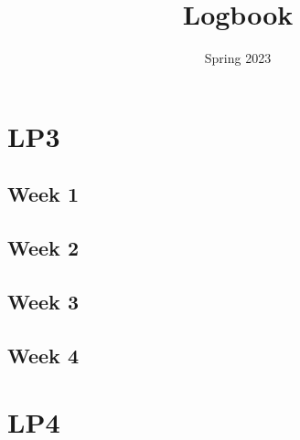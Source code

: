 \documentclass{article}
\title{Logbook}
\date{Spring 2023}
\newcommand{\logentry}[2]{
    \subsection{Week #2}
    
    \newpage
}
\begin{document}
\maketitle
\newpage
\tableofcontents
\newpage


\section{LP3}
    \logentry{3}{1}
    \logentry{3}{2}
    \logentry{3}{3}
    \logentry{3}{4}

\section{LP4}
\end{document}
